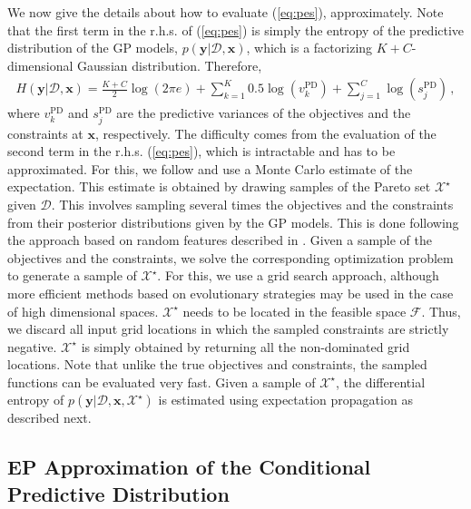 \documentclass[review,preprint,12pt]{elsarticle}
\begin{document}
We now give the details about how to evaluate (\ref{eq:pes}), approximately. 
Note that the first term in the r.h.s. of (\ref{eq:pes}) is simply the 
entropy of the predictive distribution of the GP models, 
$p(\mathbf{y}|\mathcal{D}, \textbf{x})$, which is a factorizing $K+C$-dimensional 
Gaussian distribution. Therefore,
\begin{align}
H(\textbf{y}|\mathcal{D},\textbf{x}) = \frac{K+C}{2}\log(2\pi e) + \sum_{k=1}^{K}0.5\log(v_{k}^\text{PD}) + \sum_{j=1}^{C}\log(s_j^\text{PD})\,,
	\label{eq:entr_ini}
\end{align}
where $v_k^\text{PD}$ and $s_j^\text{PD}$ are the predictive variances of the objectives and the constraints at $\mathbf{x}$, 
respectively. The difficulty comes from the evaluation of the second term in the r.h.s.  (\ref{eq:pes}), 
which is intractable and has to be approximated. For this, we follow \citep{hernandez2014predictive,hernandez2016}
and use a Monte Carlo estimate of the expectation. This estimate is obtained by drawing samples of the Pareto 
set $\mathcal{X}^{\star}$ given $\mathcal{D}$. This involves sampling several times the objectives
and the constraints from their posterior distributions given by the GP models.
This is done following the approach based on random features described in 
\citep{hernandez2014predictive,hernandez2016}. Given a sample of the
objectives and the constraints, we solve the corresponding
optimization problem to generate a sample of $\mathcal{X}^\star$.
For this, we use a grid search approach, although more efficient methods
based on evolutionary strategies may be used in the case of high
dimensional spaces. $\mathcal{X}^\star$ needs to be located in 
the feasible space $\mathcal{F}$. Thus, we discard 
all input grid locations in which the sampled constraints are strictly 
negative. $\mathcal{X}^\star$ is simply obtained by returning all 
the non-dominated grid locations. Note that unlike the true objectives
and constraints, the sampled functions can be evaluated very
fast. Given a sample of $\mathcal{X}^\star$, the differential entropy 
of $p(\mathbf{y}|\mathcal{D}, \mathbf{x},\mathcal{X}^\star)$ 
is estimated using expectation propagation as described next.

\subsection{EP Approximation of the Conditional Predictive Distribution}
\end{document}
